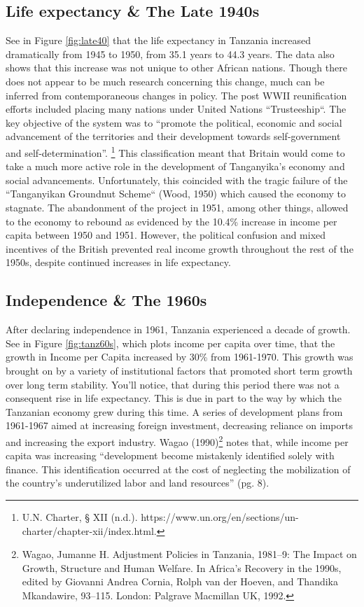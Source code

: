 \documentclass[12pt]{article}
\begin{document}
\subsection*{Life expectancy \& The Late 1940s} See in Figure \ref{fig:late40} that the life expectancy in Tanzania increased dramatically from 1945 to 1950, from 35.1 years to 44.3 years. The data also shows that this increase was not unique to other African nations. Though there does not appear to be much research concerning this change, much can be inferred from contemporaneous changes in policy. The post WWII reunification efforts included placing many nations under United Nations ``Trusteeship``. The key objective of the system was to  ``promote the political, economic and social advancement of the territories and their development towards self-government and self-determination''. \footnote{U.N. Charter, § XII (n.d.). https://www.un.org/en/sections/un-charter/chapter-xii/index.html.}
This classification meant that Britain would come to take a much more active role in the development of Tanganyika's economy and social advancements. Unfortunately, this coincided with the tragic failure of the ``Tanganyikan Groundnut Scheme`` (Wood, 1950) which caused the economy to stagnate. The abandonment of the project in 1951, among other things,  allowed to the economy to rebound as evidenced by the 10.4\% increase in income per capita between 1950 and 1951. However, the political confusion and mixed incentives of the British prevented real income growth throughout the rest of the 1950s, despite continued increases in life expectancy. 
 
\subsection*{Independence \& The 1960s}
After declaring independence in 1961, Tanzania experienced a decade of growth. See in Figure \ref{fig:tanz60s}, which plots income per capita over time, that the growth in Income per Capita increased by 30\% from 1961-1970. This growth was brought on by a variety of institutional factors that promoted short term growth over long term stability. You'll notice, that during this period there was not a consequent rise in life expectancy. This is due in part to the way by which the Tanzanian economy grew during this time. A series of development plans from 1961-1967 aimed at increasing foreign investment, decreasing reliance on imports and increasing the export industry. Wagao (1990)\footnote{Wagao, Jumanne H. Adjustment Policies in Tanzania, 1981–9: The Impact on Growth, Structure and Human Welfare. In Africa’s Recovery in the 1990s, edited by Giovanni Andrea Cornia, Rolph van der Hoeven, and Thandika Mkandawire, 93–115. London: Palgrave Macmillan UK, 1992.} notes that, while income per capita was increasing ``development become mistakenly identified solely with finance. This identification occurred at the cost of neglecting the mobilization of the country's underutilized labor and land resources'' (pg. 8).
\end{document}
